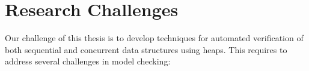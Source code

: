 \section*{Research Challenges}
%
Our challenge of this thesis is to develop techniques for automated verification of both sequential and concurrent data structures using heaps. This requires to address several challenges in model checking:
